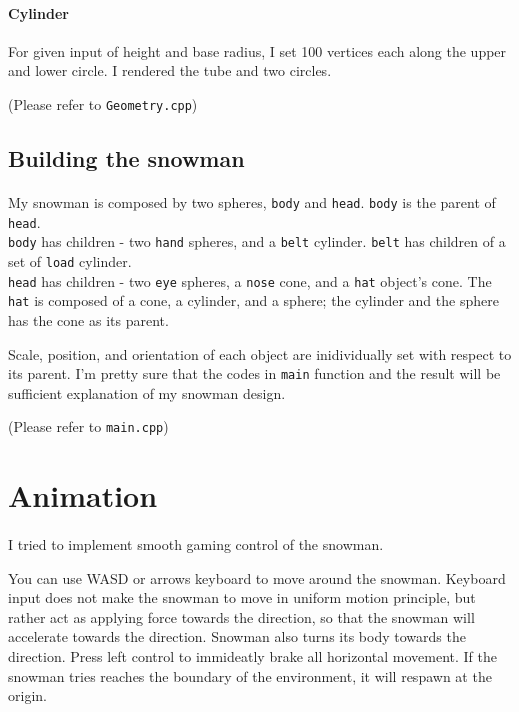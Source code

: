 \documentclass[10pt,a4paper]{article}
\begin{document}
	\paragraph{Cylinder}
	For given input of height and base radius, I set 100 vertices each along the upper and lower circle. I rendered the tube and two circles. 
	
	\begin{flushright}
		(Please refer to \texttt{Geometry.cpp})
	\end{flushright}

	\subsection{Building the snowman}
	\paragraph{}
	My snowman is composed by two spheres, \texttt{body} and \texttt{head}. \texttt{body} is the parent of \texttt{head}.\\
	\texttt{body} has children - two \texttt{hand} spheres, and a \texttt{belt} cylinder. \texttt{belt} has children of a set of \texttt{load} cylinder.\\
	\texttt{head} has children - two \texttt{eye} spheres, a \texttt{nose} cone, and a \texttt{hat} object's cone. The \texttt{hat} is composed of a cone, a cylinder, and a sphere; the cylinder and the sphere has the cone as its parent. 
	
	Scale, position, and orientation of each object are inidividually set with respect to its parent. I'm pretty sure that the codes in \texttt{main} function and the result will be sufficient explanation of my snowman design.
	
	\begin{flushright}
		(Please refer to \texttt{main.cpp})
	\end{flushright}
	
	\section{Animation}
	\paragraph{}
	I tried to implement smooth gaming control of the snowman.
	
	You can use WASD or arrows keyboard to move around the snowman. Keyboard input does not make the snowman to move in uniform motion principle, but rather act as applying force towards the direction, so that the snowman will accelerate towards the direction. Snowman also turns its body towards the direction. Press left control to immideatly brake all horizontal movement. If the snowman tries reaches the boundary of the environment, it will respawn at the origin.
	
\end{document}
